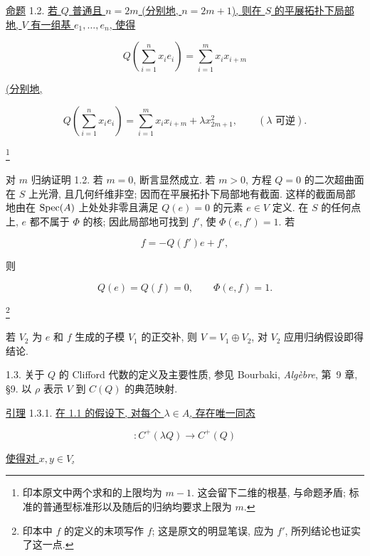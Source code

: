 \underline{命题} 1.2. \underline{若 $Q$ 普通且 $n=2m$ (分别地, $n=2m+1$), 则在 $S$ 的平展拓扑下局部地, $V$ 有一组基 $e_1,\ldots,e_n$, 使得}


\begin{equation*}
Q\!\left(\sum_{i=1}^{n}x_i e_i\right)
=\sum_{i=1}^{m}x_i x_{i+m}
\end{equation*}

\noindent\underline{(分别地,}

\begin{equation*}
Q\!\left(\sum_{i=1}^{n}x_i e_i\right)
=\sum_{i=1}^{m}x_i x_{i+m}+\lambda x_{2m+1}^{2},
\qquad (\lambda\text{ 可逆}).
\end{equation*}

\footnote{印本原文中两个求和的上限均为 $m-1$. 这会留下二维的根基, 与命题矛盾; 标准的普通型标准形以及随后的归纳均要求上限为 $m$.}

对 $m$ 归纳证明 1.2. 若 $m=0$, 断言显然成立. 若 $m>0$, 方程 $Q=0$ 的二次超曲面在 $S$ 上光滑, 且几何纤维非空; 因而在平展拓扑下局部地有截面. 这样的截面局部地由在 $\operatorname{Spec}(A)$ 上处处非零且满足 $Q(e)=0$ 的元素 $e\in V$ 定义. 在 $S$ 的任何点上, $e$ 都不属于 $\Phi$ 的核; 因此局部地可找到 $f'$, 使 $\Phi(e,f')=1$. 若

\begin{equation*}
f=-Q(f')e+f',
\end{equation*}

则

\begin{equation*}
Q(e)=Q(f)=0,\qquad \Phi(e,f)=1.
\end{equation*}

\footnote{印本中 $f$ 的定义的末项写作 $f$; 这是原文的明显笔误, 应为 $f'$, 所列结论也证实了这一点.}

若 $V_2$ 为 $e$ 和 $f$ 生成的子模 $V_1$ 的正交补, 则 $V=V_1\oplus V_2$, 对 $V_2$ 应用归纳假设即得结论.

1.3. 关于 $Q$ 的 Clifford 代数的定义及主要性质, 参见 Bourbaki, \emph{Algèbre}, 第~9 章, \S9. 以 $\rho$ 表示 $V$ 到 $C(Q)$ 的典范映射.

\underline{引理} 1.3.1. \underline{在 1.1 的假设下, 对每个 $\lambda\in A$, 存在唯一同态}

\begin{equation*}
[\lambda]\colon C^+(\lambda Q)\longrightarrow C^+(Q)
\end{equation*}

\underline{使得对 $x,y\in V$,}

